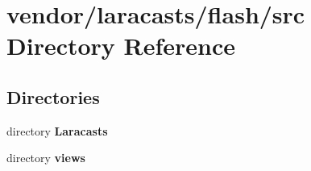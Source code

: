 \section{vendor/laracasts/flash/src Directory Reference}
\label{dir_96332c39b07acbbab6e07776dea4492c}
\subsection*{Directories}
\begin{DoxyCompactItemize}
\item 
directory {\bf Laracasts}
\item 
directory {\bf views}
\end{DoxyCompactItemize}
